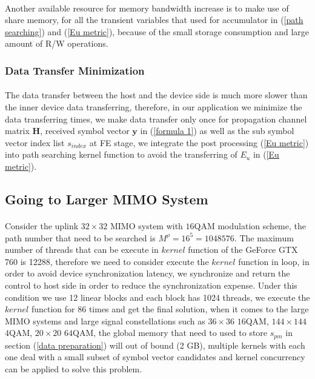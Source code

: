 \documentclass[12pt,a4paper,final]{article}
\begin{document}
\begin{spacing}{2.5}
 \paragraph{}Another available resource for memory bandwidth increase is to make use of share memory, for all the transient variables that used for accumulator in (\ref{path searching}) and (\ref{Eu metric}), because of the small storage consumption and large amount of R/W operations.   
\subsubsection{Data Transfer Minimization}   
\paragraph{}The data transfer between the host and the device side is much more slower than the inner device data transferring, therefore, in our application we minimize the data transferring times, we make data transfer only once for propagation channel matrix $\mathbf{H}$, received symbol vector $\mathbf{y}$ in (\ref{formula 1}) as well as the sub symbol vector index list $\mathit{s_{index}}$ at FE stage, we integrate the post processing (\ref{Eu metric}) into path searching kernel function to avoid the transferring of $E_{u}$ in (\ref{Eu metric}).  
\subsection{Going to Larger MIMO System}
  \paragraph{}Consider the uplink $32\times 32$ MIMO system with $16$QAM modulation scheme, the path number that need to be searched is $M^{\rho}=16^{5}=1048576$. The maximum number of threads that can be execute in $\mathit{kernel}$ function of the GeForce GTX 760 is 12288, therefore we need to consider execute the $\mathit{kernel}$ function in loop, in order to avoid device synchronization latency, we synchronize and return the control to host side in order to reduce the synchronization expense. Under this condition we use 12 linear blocks and each block has 1024 threads, we execute the $\mathit{kernel}$ function for 86 times and get the final solution,  when it comes to the large MIMO systems and large signal constellations such as $36\times 36$ $16$QAM, $144\times 144$ $4$QAM, $20\times 20$ $64$QAM, the global memory that need to used to store $s_{pm}$ in section (\ref{data preparation}) will out of bound (2 GB), multiple kernels with each one deal with a small subset of symbol vector candidates and kernel concurrency\cite{nvidia2008programming} can be applied to solve this problem.

\end{spacing}
\end{document}
